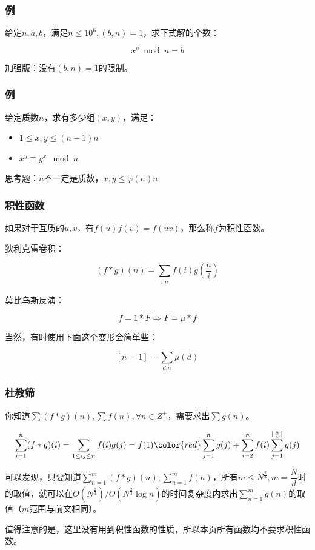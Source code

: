\documentclass[10pt]{beamer}
\begin{document}
	\begin{frame}
		\frametitle{例}
	
		给定$n,a,b$，满足$n\le 10^6,(b,n)=1$，求下式解的个数：

		$$
		x^a \bmod n=b
		$$

		加强版：没有$(b,n)=1$的限制。
	
	\end{frame}
	\begin{frame}
		\frametitle{例}
	
		给定质数$n$，求有多少组$(x,y)$，满足：

		\begin{itemize}
			\item $1\le x,y\le (n-1)n$
			\item $x^y\equiv y^x\mod n$
		\end{itemize}

		思考题：$n$不一定是质数，$x,y\le \varphi(n)n$
	
	\end{frame}
	\begin{frame}
		\frametitle{积性函数}
	
		如果对于互质的$u,v$，有$f(u)f(v)=f(uv)$，那么称$f$为积性函数。

		狄利克雷卷积：

		$$
		(f*g)(n)=\sum_{i|n}f(i)g(\dfrac ni)
		$$

		莫比乌斯反演：

		$$
		f=1*F\Rightarrow F=\mu*f
		$$

		当然，有时使用下面这个变形会简单些：

		$$
		[n=1]=\sum_{d|n}\mu(d)
		$$
	
	\end{frame}
	\begin{frame}
		\frametitle{杜教筛}
	
		你知道$\sum (f*g)(n),\sum f(n),\forall n\in Z^+$，需要求出$\sum g(n)$。

		$$
		\sum_{i=1}^n (f*g)(i)=\sum_{1\le ij\le n}f(i)g(j)=f(1){\color{red}\sum_{j=1}^n g(j)}+\sum_{i=2}^n f(i)\sum_{j=1}^{\lfloor\frac{n}{i}\rfloor} g(j)
		$$

		可以发现，只要知道$\sum_{n=1}^{m}(f*g)(n),\sum_{n=1}^{m} f(n)$，所有$m\le N^{\frac 23},m=\dfrac Nd$时的取值，就可以在$O(N^{\frac 23})/O(N^{\frac 23}\log n)$的时间复杂度内求出$\sum_{n=1}^mg(n)$的取值（$m$范围与前文相同）。

		值得注意的是，这里没有用到积性函数的性质，所以本页所有函数均不要求积性函数。
	
	\end{frame}
\end{document}
